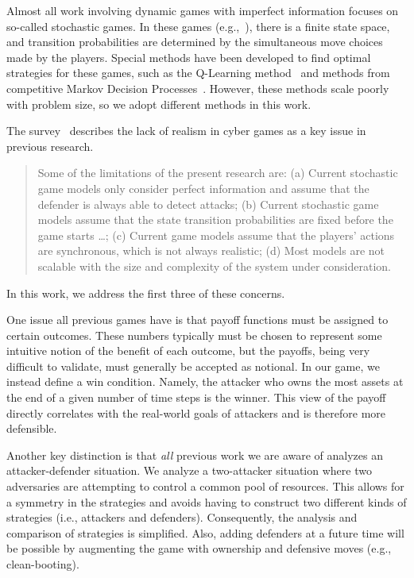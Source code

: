 \documentclass{sig-alternate}
\begin{document}

Almost all work involving dynamic games with imperfect information
focuses on so-called stochastic games. In these games
(e.g.,~\cite{alpcan2006intrusion, lye2005game, nguyen2009stochastic,
  sallhammar2006stochastic, xiaolin2008markov}), there is a finite
state space, and transition probabilities are determined by the
simultaneous move choices made by the players. Special methods have
been developed to find optimal strategies for these games, such as the
Q-Learning method~\cite{hu2003nash} and methods from competitive
Markov Decision Processes~\cite{filar2012competitive}. However, these
methods scale poorly with problem size, so we adopt different methods
in this work.

The survey~\cite{roy2010survey} describes the lack of realism in cyber
games as a key issue in previous research.
\begin{quote}
  Some of the limitations of the present research are: (a) Current
  stochastic game models only consider perfect information and
  assume that the defender is always able to detect attacks; (b)
  Current stochastic game models assume that the state transition
  probabilities are fixed before the game starts \ldots; 
  (c) Current game models assume that the players' actions
  are synchronous, which is not always realistic; (d) Most models are
  not scalable with the size and complexity of the system under
  consideration.
\end{quote}
In this work, we address the first three of these concerns.

One issue all previous games have is that payoff functions must be
assigned to certain outcomes. These numbers typically must be chosen
to represent some intuitive notion of the benefit of each outcome, but
the payoffs, being very difficult to validate, must generally be
accepted as notional. In our game, we instead define a win condition. Namely,
the attacker who owns the most assets at the end of a given number of
time steps is the winner. This view of the payoff directly correlates
with the real-world goals of attackers and is therefore more
defensible.

Another key distinction is that {\em all} previous work we are aware
of analyzes an attacker-defender situation. We analyze a two-attacker
situation where two adversaries are attempting to control a common
pool of resources. This allows for a symmetry in the strategies and
avoids having to construct two different kinds of strategies (i.e.,
attackers and defenders). Consequently, the analysis and comparison of
strategies is simplified. Also, adding defenders at a future time will
be possible by augmenting the game with ownership and defensive moves
(e.g., clean-booting).
\end{document}
